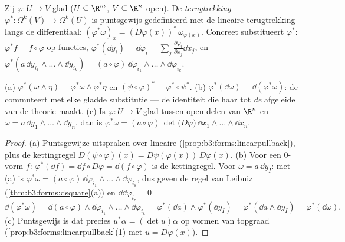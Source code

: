 \begin{definition}[Terugtrekking]\label{def:b3:forms:pullback}
Zij $\varphi\colon U \to V$ glad ($U \subseteq \R^m$, $V
\subseteq \R^n$ open). De \emph{terugtrekking}
$\varphi^*\colon \Omega^k(V) \to \Omega^k(U)$ is puntsgewijs
gedefinieerd met de lineaire terugtrekking langs de
differentiaal: $(\varphi^*\omega)_x =
(D\varphi(x))^*\,\omega_{\varphi(x)}$. Concreet substitueert
$\varphi^*$: $\varphi^*f = f \circ \varphi$ op functies,
$\varphi^*(\dd y_i) = \dd\varphi_i =
\sum_j\frac{\partial\varphi_i}{\partial x_j}\dd x_j$, en
$\varphi^*(a\,\dd y_{i_1}\wedge\dots\wedge \dd y_{i_k}) =
(a\circ\varphi)\,\dd\varphi_{i_1}\wedge\dots\wedge
\dd\varphi_{i_k}$.
\end{definition}

\begin{theorem}\label{thm:b3:forms:pullback}
(a) $\varphi^*(\omega \wedge \eta) = \varphi^*\omega \wedge
\varphi^*\eta$ en $(\psi \circ \varphi)^* = \varphi^* \circ
\psi^*$.
(b) $\varphi^*(\dd\omega) = \dd(\varphi^*\omega)$: de  commuteert met elke gladde substitutie --- de
identiteit die haar tot \emph{de} afgeleide van de theorie
maakt.
(c) Is $\varphi\colon U \to V$ glad tussen open delen van $\R^n$
en $\omega = a\,\dd y_1 \wedge \dots \wedge \dd y_n$, dan is
$\varphi^*\omega = (a \circ \varphi)\,\det\bigl(D\varphi\bigr)\,
\dd x_1 \wedge \dots \wedge \dd x_n$.
\end{theorem}

\begin{proof}
(a) Puntsgewijze uitspraken over lineaire 
(\cref{prop:b3:forms:linearpullback}), plus de kettingregel
$D(\psi\circ\varphi)(x) = D\psi(\varphi(x))\,D\varphi(x)$.
(b) Voor een $0$-vorm $f$: $\varphi^*(\dd f) = \dd f \circ
D\varphi = \dd(f \circ \varphi)$ is de kettingregel. Voor $\omega
= a\,\dd y_I$: met (a) is $\varphi^*\omega =
(a\circ\varphi)\,\dd\varphi_{i_1}\wedge\dots\wedge
\dd\varphi_{i_k}$, dus geven de regel van Leibniz
(\cref{thm:b3:forms:dsquare}(a)) en $\dd\dd\varphi_{i_r} = 0$
\[
\dd(\varphi^*\omega) = \dd(a\circ\varphi) \wedge
\dd\varphi_{i_1}\wedge\dots\wedge\dd\varphi_{i_k}
= \varphi^*(\dd a) \wedge \varphi^*(\dd y_I)
= \varphi^*(\dd a \wedge \dd y_I) =
\varphi^*(\dd\omega).
\]
(c) Puntsgewijs is dat precies $u^*\alpha = (\det u)\alpha$ op
vormen van topgraad (\cref{prop:b3:forms:linearpullback}(1) met
$u = D\varphi(x)$).
\end{proof}

